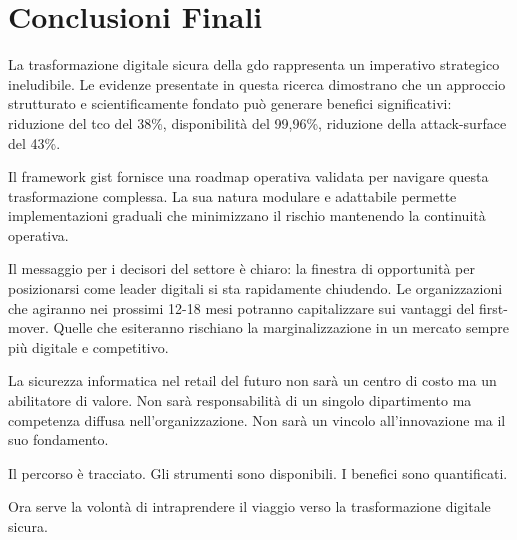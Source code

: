 \section{\texorpdfstring{Conclusioni Finali}{5.8 - Conclusioni Finali}}
\label{sec:5.8}

La trasformazione digitale sicura della \gls{gdo} rappresenta un imperativo strategico ineludibile. Le evidenze presentate in questa ricerca dimostrano che un approccio strutturato e scientificamente fondato può generare benefici significativi: riduzione del \gls{tco} del 38\%, disponibilità del 99,96\%, riduzione della \gls{attack-surface} del 43\%.

Il framework \gls{gist} fornisce una roadmap operativa validata per navigare questa trasformazione complessa. La sua natura modulare e adattabile permette implementazioni graduali che minimizzano il rischio mantenendo la continuità operativa.

Il messaggio per i decisori del settore è chiaro: la finestra di opportunità per posizionarsi come leader digitali si sta rapidamente chiudendo. Le organizzazioni che agiranno nei prossimi 12-18 mesi potranno capitalizzare sui vantaggi del first-mover. Quelle che esiteranno rischiano la marginalizzazione in un mercato sempre più digitale e competitivo.

La sicurezza informatica nel retail del futuro non sarà un centro di costo ma un abilitatore di valore. Non sarà responsabilità di un singolo dipartimento ma competenza diffusa nell'organizzazione. Non sarà un vincolo all'innovazione ma il suo fondamento.

Il percorso è tracciato. Gli strumenti sono disponibili. I benefici sono quantificati. 

Ora serve la volontà di intraprendere il viaggio verso la trasformazione digitale sicura.


